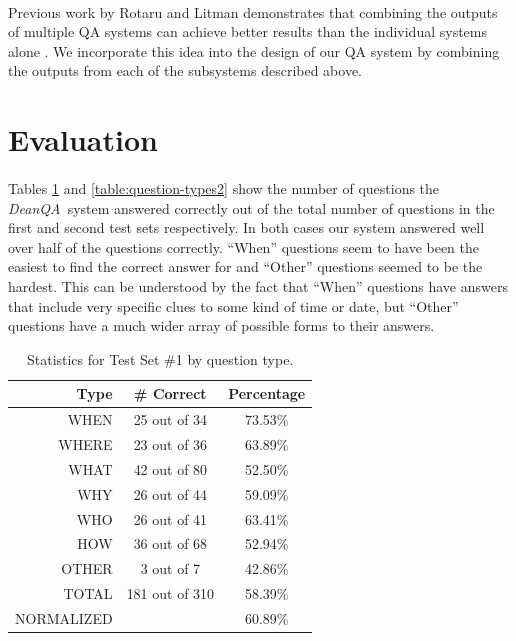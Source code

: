 \documentclass[11pt,letterpaper]{article}
\newcommand{\name}{\emph{DeanQA~}}
\begin{document}
\paragraph{}
Previous work by Rotaru and Litman demonstrates that combining
the outputs of multiple QA systems can achieve better results than the
individual systems alone \cite{rotaru2005}. We incorporate this idea
into the design of our QA system by combining the outputs from each of
the subsystems described above.


\section{Evaluation}
\label{sec:evaluation}
\paragraph{}
Tables \ref{table:question-types1} and \ref{table:question-types2} show the 
number of questions the \name system answered correctly out of the total
 number of questions in the first and second test sets respectively.
 In both cases our system answered well over half of the questions 
 correctly.  ``When'' questions seem to have been the easiest to find
 the correct answer for and ``Other'' questions seemed to be the hardest.
 This can be understood by the fact that ``When'' questions have answers 
 that include very specific clues to some kind of time or date, but 
 ``Other'' questions have a much wider array of possible forms to their answers.


\begin{table}
\centering

	\begin{tabular}{|r|c|c|}
	\hline
	Type   & \# Correct & Percentage \\
	\hline
	\hline
	WHEN   &  25 out of  34 &  73.53\% \\
	\hline
	WHERE  &  23 out of  36 &  63.89\% \\
	\hline
	WHAT   &  42 out of  80 &  52.50\% \\
	\hline
	WHY    &  26 out of  44 &  59.09\% \\
	\hline
	WHO    &  26 out of  41 &  63.41\% \\
	\hline
	HOW    &  36 out of  68 &  52.94\% \\
	\hline
	OTHER  &   3 out of   7 &  42.86\% \\
	\hline
	\hline
	TOTAL  & 181 out of 310 &  58.39\% \\
	\tiny{NORMALIZED}  &  &  60.89\% \\
	\hline
	\end{tabular}

\caption{Statistics for Test Set \#1 by question type.}
\label{table:question-types1}
\end{table}
\end{document}
